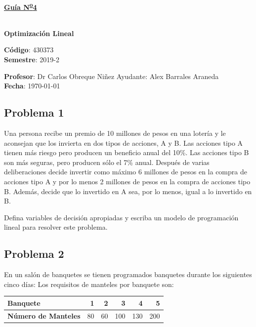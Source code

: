 \documentclass[letterpaper]{article}
\begin{document}
\vspace*{0.5\baselineskip}
\begin{center}
\begin{Large}
\textbf{\underline{Guía N\textsuperscript{\underline{o}}4}}
\end{Large}\\
\vspace*{0.5\baselineskip}
\textbf{Optimización Lineal} \\
\vspace*{0.5\baselineskip}
\begin{footnotesize}
\textbf{Código}: 430373\\
\textbf{Semestre}: 2019-2
\end{footnotesize}
\end{center}

\noindent \textbf{Profesor}: Dr Carlos Obreque Niñez  \hfill Ayudante: Alex Barrales Araneda\\
\noindent \textbf{Fecha}: \today

\subsection*{Problema 1}
Una persona recibe un premio de 10 millones de pesos en una lotería y le aconsejan que los invierta en dos tipos de acciones, A y B. Las acciones tipo A tienen más riesgo pero producen un beneficio anual del 10\%. Las acciones tipo B son más seguras, pero producen sólo el 7\% anual. Después de varias deliberaciones decide invertir como máximo 6 millones de pesos en la compra de acciones tipo A y por lo menos 2 millones de pesos en la compra de acciones tipo B. Además, decide que lo invertido en A sea, por lo menos, igual a lo invertido en B. 

Defina variables de decisión apropiadas y escriba un modelo de programación lineal para resolver este problema.

\subsection*{Problema 2}
En un salón de banquetes se tienen programados banquetes durante los siguientes cinco días: Los requisitos de manteles por banquete son:

\begin{table}[H]
\centering
\begin{tabular}{lrrrrr}
\hline
\textbf{Banquete}           & 1  & 2  & 3   & 4   & 5   \\ \hline
\textbf{Número de Manteles} & 80 & 60 & 100 & 130 & 200 \\ \hline
\end{tabular}
\end{table}
\end{document}
